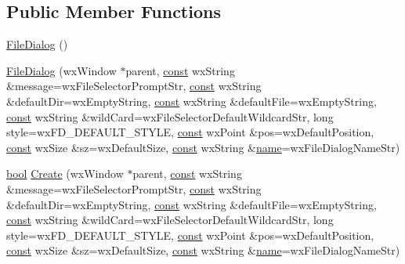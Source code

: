 \subsection*{Public Member Functions}
\begin{DoxyCompactItemize}
\item 
\hyperlink{class_file_dialog_aa83fcb95b06464c2a57dd45ba353d94e}{File\+Dialog} ()
\item 
\hyperlink{class_file_dialog_ace5a468fcd70436281f288509ce13574}{File\+Dialog} (wx\+Window $\ast$parent, \hyperlink{getopt1_8c_a2c212835823e3c54a8ab6d95c652660e}{const} wx\+String \&message=wx\+File\+Selector\+Prompt\+Str, \hyperlink{getopt1_8c_a2c212835823e3c54a8ab6d95c652660e}{const} wx\+String \&default\+Dir=wx\+Empty\+String, \hyperlink{getopt1_8c_a2c212835823e3c54a8ab6d95c652660e}{const} wx\+String \&default\+File=wx\+Empty\+String, \hyperlink{getopt1_8c_a2c212835823e3c54a8ab6d95c652660e}{const} wx\+String \&wild\+Card=wx\+File\+Selector\+Default\+Wildcard\+Str, long style=wx\+F\+D\+\_\+\+D\+E\+F\+A\+U\+L\+T\+\_\+\+S\+T\+Y\+LE, \hyperlink{getopt1_8c_a2c212835823e3c54a8ab6d95c652660e}{const} wx\+Point \&pos=wx\+Default\+Position, \hyperlink{getopt1_8c_a2c212835823e3c54a8ab6d95c652660e}{const} wx\+Size \&sz=wx\+Default\+Size, \hyperlink{getopt1_8c_a2c212835823e3c54a8ab6d95c652660e}{const} wx\+String \&\hyperlink{lib_2expat_8h_a1b49b495b59f9e73205b69ad1a2965b0}{name}=wx\+File\+Dialog\+Name\+Str)
\item 
\hyperlink{mac_2config_2i386_2lib-src_2libsoxr_2soxr-config_8h_abb452686968e48b67397da5f97445f5b}{bool} \hyperlink{class_file_dialog_a9f98de2f99539f5dad4b940842ba0f29}{Create} (wx\+Window $\ast$parent, \hyperlink{getopt1_8c_a2c212835823e3c54a8ab6d95c652660e}{const} wx\+String \&message=wx\+File\+Selector\+Prompt\+Str, \hyperlink{getopt1_8c_a2c212835823e3c54a8ab6d95c652660e}{const} wx\+String \&default\+Dir=wx\+Empty\+String, \hyperlink{getopt1_8c_a2c212835823e3c54a8ab6d95c652660e}{const} wx\+String \&default\+File=wx\+Empty\+String, \hyperlink{getopt1_8c_a2c212835823e3c54a8ab6d95c652660e}{const} wx\+String \&wild\+Card=wx\+File\+Selector\+Default\+Wildcard\+Str, long style=wx\+F\+D\+\_\+\+D\+E\+F\+A\+U\+L\+T\+\_\+\+S\+T\+Y\+LE, \hyperlink{getopt1_8c_a2c212835823e3c54a8ab6d95c652660e}{const} wx\+Point \&pos=wx\+Default\+Position, \hyperlink{getopt1_8c_a2c212835823e3c54a8ab6d95c652660e}{const} wx\+Size \&sz=wx\+Default\+Size, \hyperlink{getopt1_8c_a2c212835823e3c54a8ab6d95c652660e}{const} wx\+String \&\hyperlink{lib_2expat_8h_a1b49b495b59f9e73205b69ad1a2965b0}{name}=wx\+File\+Dialog\+Name\+Str)

\end{DoxyCompactItemize}
